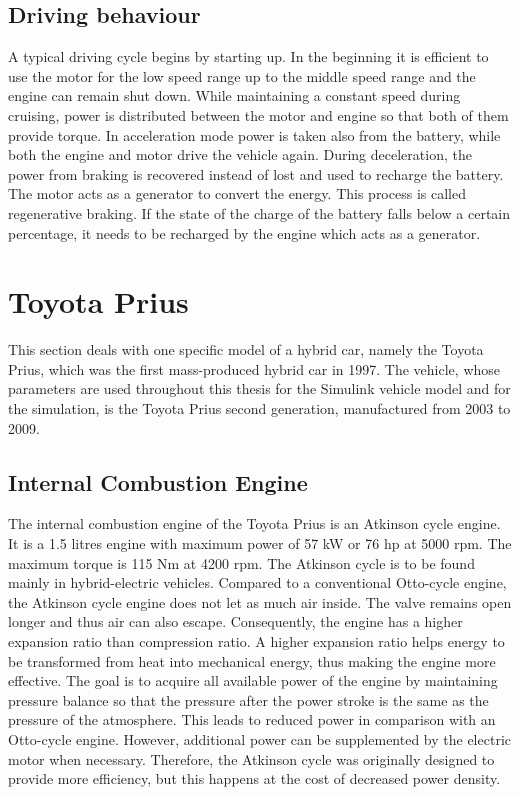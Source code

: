 \subsection{Driving behaviour}
A typical driving cycle begins by starting up. In the beginning it is efficient to use the motor for the low speed range up to the middle speed range and the engine can remain shut down. While maintaining a constant speed during cruising, power is distributed between the motor and engine so that both of them provide torque. In acceleration mode power is taken also from the battery, while both the engine and motor drive the vehicle again. During deceleration, the power from braking is recovered instead of lost and used to recharge the battery. The motor acts as a generator to convert the energy. This process is called regenerative braking. If the state of the charge of the battery falls below a certain percentage, it needs to be recharged by the engine which acts as a generator.

\section{Toyota Prius}
This section deals with one specific model of a hybrid car, namely the Toyota Prius, which was the first mass-produced hybrid car in 1997. The vehicle, whose parameters are used throughout this thesis for the Simulink vehicle model and for the simulation, is the Toyota Prius second generation, manufactured from 2003 to 2009.

\subsection{Internal Combustion Engine}
The internal combustion engine of the Toyota Prius is an Atkinson cycle engine. It is a 1.5 litres engine with maximum power of 57 kW or 76 hp at 5000 rpm. The maximum torque is 115 Nm at 4200 rpm. The Atkinson cycle is to be found mainly in hybrid-electric vehicles. Compared to a conventional Otto-cycle engine, the Atkinson cycle engine does not let as much air inside. The valve remains open longer and thus air can also escape. Consequently, the engine has a higher expansion ratio than compression ratio. A higher expansion ratio helps energy to be transformed from heat into mechanical energy, thus making the engine more effective. The goal is to acquire all available power of the engine by maintaining pressure balance so that the pressure after the power stroke is the same as the pressure of the atmosphere. This leads to reduced power in comparison with an Otto-cycle engine. However, additional power can be supplemented by the electric motor when necessary. Therefore, the Atkinson cycle was originally designed to provide more efficiency, but this happens at the cost of decreased power density. 

